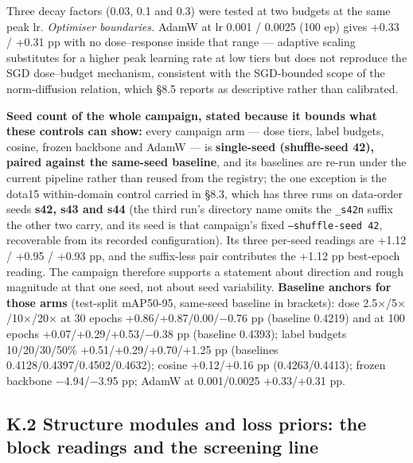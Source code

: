 \documentclass[pdflatex,sn-mathphys-ay]{sn-jnl}
\begin{document}
Three decay factors (0.03, 0.1 and 0.3) were tested at two budgets at the same peak lr. \emph{Optimiser boundaries.} AdamW at lr 0.001 / 0.0025 (100 ep) gives +0.33 / +0.31 pp with no dose--response inside that range --- adaptive scaling substitutes for a higher peak learning rate at low tiers but does not reproduce the SGD dose--budget mechanism, consistent with the SGD-bounded scope of the norm-diffusion relation, which \S{}8.5 reports as descriptive rather than calibrated.

\textbf{Seed count of the whole campaign, stated because it bounds what these controls can show:} every campaign arm --- dose tiers, label budgets, cosine, frozen backbone and AdamW --- is \textbf{single-seed (shuffle-seed 42), paired against the same-seed baseline}, and its baselines are re-run under the current pipeline rather than reused from the registry; the one exception is the dota15 within-domain control carried in \S{}8.3, which has three runs on data-order seeds \textbf{s42, s43 and s44} (the third run's directory name omits the \texttt{\_s42n} suffix the other two carry, and its seed is that campaign's fixed \texttt{--shuffle-seed 42}, recoverable from its recorded configuration). Its three per-seed readings are +1.12 / +0.95 / +0.93 pp, and the suffix-less pair contributes the +1.12 pp best-epoch reading. The campaign therefore supports a statement about direction and rough magnitude at that one seed, not about seed variability. \textbf{Baseline anchors for those arms} (test-split mAP50-95, same-seed baseline in brackets): dose 2.5\ensuremath{\times}/5\ensuremath{\times}/10\ensuremath{\times}/20\ensuremath{\times} at 30 epochs +0.86/+0.87/0.00/\ensuremath{-}0.76 pp (baseline 0.4219) and at 100 epochs +0.07/+0.29/+0.53/\ensuremath{-}0.38 pp (baseline 0.4393); label budgets 10/20/30/50\% +0.51/+0.29/+0.70/+1.25 pp (baselines 0.4128/0.4397/0.4502/0.4632); cosine +0.12/+0.16 pp (0.4263/0.4413); frozen backbone \ensuremath{-}4.94/\ensuremath{-}3.95 pp; AdamW at 0.001/0.0025 +0.33/+0.31 pp.

\subsection*{K.2 Structure modules and loss priors: the block readings and the screening line}
\end{document}
